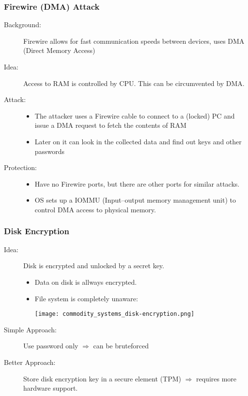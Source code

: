 \subsubsection{Firewire (DMA) Attack}
\begin{description}
  \item[Background:] Firewire  allows for fast communication speeds
    between devices, uses DMA (Direct Memory Access)
  \item[Idea:] Access to RAM is controlled by CPU. This can be circumvented by
    DMA.
  \item[Attack:]\hfill
    \begin{itemize}
      \item The attacker uses a Firewire cable to connect to a (locked) PC
	and issue a DMA request to fetch the contents of RAM
      \item Later on it can look in the collected data and find out keys and
	other passwords
    \end{itemize}
  \item[Protection:] \hfill
    \begin{itemize}
      \item Have no Firewire ports, but there are other ports for
	similar attacks.
      \item OS sets up a IOMMU (Input–output memory management unit) to control
	DMA access to physical memory.
    \end{itemize}
\end{description}


\subsubsection{Disk Encryption}
\begin{description}
  \item[Idea:] Disk is encrypted and unlocked by a secret key.
    \begin{itemize}
      \item Data on disk is allways encrypted.
      \item File system is completely unaware:
	\begin{center}
	  \texttt{[image: commodity\_systems\_disk-encryption.png]}
	\end{center}
    \end{itemize}

  \item[Simple Approach:] Use password only $\Rightarrow$ can be
    bruteforced
  \item[Better Approach:] Store disk encryption key in a secure element
    (TPM) $\Rightarrow$ requires more hardware support.
\end{description}


